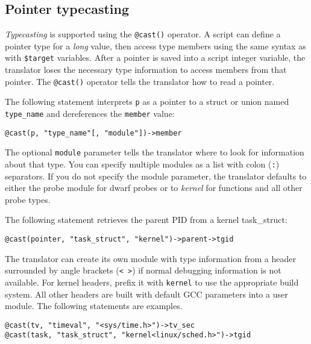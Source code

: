 \documentclass[twoside,english]{article}
\newenvironment{vindent}
{\begin{list}{}{\setlength{\listparindent}{6pt}}
\item[]}
{\end{list}}
\begin{document}
\subsection{Pointer typecasting}

\emph{Typecasting} is supported using the \texttt{@cast()} operator. A
script can define a pointer type for a \emph{long} value, then access
type members using the same syntax as with \texttt{\$target}
variables. After a pointer is saved into a script integer variable,
the translator loses the necessary type information to access members
from that pointer.  The \texttt{@cast()} operator tells the translator
how to read a pointer.

The following statement interprets \texttt{p} as a pointer to a struct
or union named \texttt{type\_name} and dereferences the
\texttt{member} value:
\begin{vindent}
\begin{verbatim}
@cast(p, "type_name"[, "module"])->member
\end{verbatim}
\end{vindent}

The optional \texttt{module} parameter tells the translator where to
look for information about that type. You can specify multiple modules
as a list with colon (\texttt{:}) separators. If you do not specify
the module parameter, the translator defaults to either the probe
module for dwarf probes or to \textit{kernel} for functions and all
other probe types.

The following statement retrieves the parent PID from a kernel
task\_struct:
\begin{vindent}
\begin{verbatim}
@cast(pointer, "task_struct", "kernel")->parent->tgid
\end{verbatim}
\end{vindent}

The translator can create its own module with type information from a
header surrounded by angle brackets (\texttt{< >}) if normal debugging
information is not available.  For kernel headers, prefix it with
\texttt{kernel} to use the appropriate build system.  All other
headers are built with default GCC parameters into a user module. The
following statements are examples.
\begin{vindent}
\begin{verbatim}
@cast(tv, "timeval", "<sys/time.h>")->tv_sec
@cast(task, "task_struct", "kernel<linux/sched.h>")->tgid
\end{verbatim}
\end{vindent}
\end{document}
